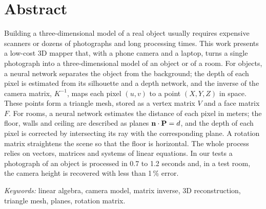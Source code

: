 \newpage
\section*{Abstract}

Building a three-dimensional model of a real object usually requires expensive
scanners or dozens of photographs and long processing times. This work
presents a low-cost 3D mapper that, with a phone camera and a laptop, turns a
single photograph into a three-dimensional model of an object or of a room.
For objects, a neural network separates the object from the background; the
depth of each pixel is estimated from its silhouette and a depth network, and the inverse of the
camera matrix, $K^{-1}$, maps each pixel $(u,v)$ to a point $(X,Y,Z)$ in space.
These points form a triangle mesh, stored as a vertex matrix $V$ and a face
matrix $F$. For rooms, a neural network estimates the distance of each pixel in
meters; the floor, walls and ceiling are described as planes
$\mathbf{n}\cdot\mathbf{P}=d$, and the depth of each pixel is corrected by
intersecting its ray with the corresponding plane. A rotation matrix
straightens the scene so that the floor is horizontal. The whole process
relies on vectors, matrices and systems of linear equations. In our tests a
photograph of an object is processed in 0.7 to 1.2 seconds and, in a test
room, the camera height is recovered with less than 1\,\% error.

\textit{Keywords:} linear algebra, camera model, matrix inverse, 3D
reconstruction, triangle mesh, planes, rotation matrix.
